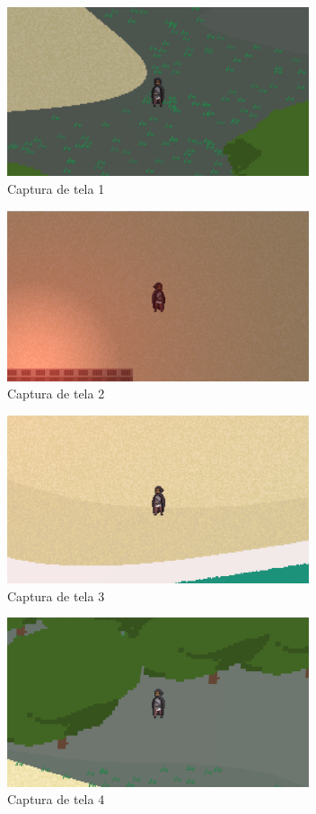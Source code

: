 \documentclass[12pt, 
openright, 
oneside, 
a4paper,    
brazil]{facom-ufu-abntex2}
\begin{document}
\begin{figure}[H]
	\centering
	\includegraphics[width=24em]{imagens/ss1.png}
	\caption{Captura de tela 1}
	\label{fig:ss1}
\end{figure}

\begin{figure}[H]
	\centering
	\includegraphics[width=24em]{imagens/ss2.png}
	\caption{Captura de tela 2}
	\label{fig:ss2}
\end{figure}
\begin{figure}[H]
	\centering
	\includegraphics[width=24em]{imagens/ss3.png}
	\caption{Captura de tela 3}
	\label{fig:ss3}
\end{figure}
\begin{figure}[H]
	\centering
	\includegraphics[width=24em]{imagens/ss4.png}
	\caption{Captura de tela 4}
	\label{fig:ss4}
\end{figure}
\end{document}
